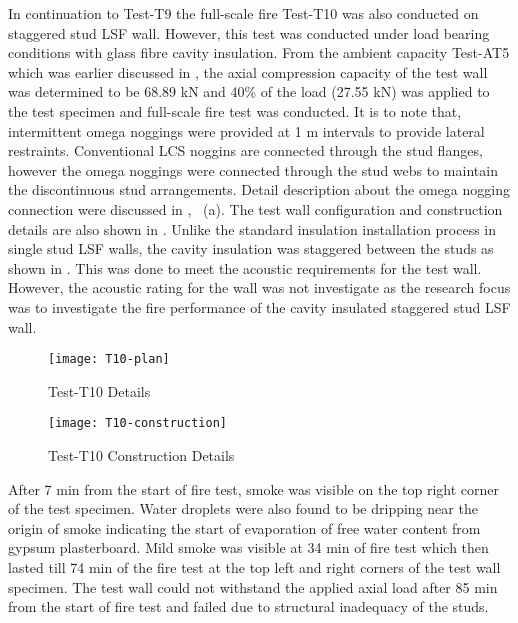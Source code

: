 In continuation to Test-T9 the full-scale fire Test-T10 was also conducted on staggered stud LSF wall. However, this test was conducted under load bearing conditions with glass fibre cavity insulation. From the ambient capacity Test-AT5 which was earlier discussed in , the axial compression capacity of the test wall was determined to be 68.89 kN and 40\% of the load (27.55 kN) was applied to the test specimen and full-scale fire test was conducted. It is to note that, intermittent omega noggings were provided at 1 m intervals to provide lateral restraints. Conventional LCS noggins are connected through the stud flanges, however the omega noggings were connected through the stud webs to maintain the discontinuous stud arrangements. Detail description about the omega nogging connection were discussed in , ~(a). The test wall configuration and construction details are also shown in . Unlike the standard insulation installation process in single stud LSF walls, the cavity insulation was staggered between the studs as shown in . This was done to meet the acoustic requirements for the test wall. However, the acoustic rating for the wall was not investigate as the research focus was to investigate the fire performance of the cavity insulated staggered stud LSF wall. 
\begin{figure}[!htbp]
	\centering
		\texttt{[image: T10-plan]}
		\caption{Test-T10 Details}
		\label{fig:T10-plan}
\end{figure}
\begin{figure}[!htbp]
	\centering
		\texttt{[image: T10-construction]}
		\caption{Test-T10 Construction Details}
		\label{fig:T10-construction}
\end{figure}

After 7 min from the start of fire test, smoke was visible on the top right corner of the test specimen. Water droplets were also found to be dripping near the origin of smoke indicating the start of evaporation of free water content from gypsum plasterboard. Mild smoke was visible at 34 min of fire test which then lasted till 74 min of the fire test at the top left and right corners of the test wall specimen. The test wall could not withstand the applied axial load after 85 min from the start of fire test and failed due to structural inadequacy of the studs. 

